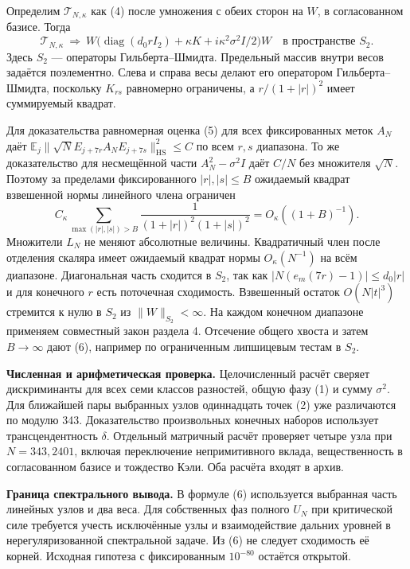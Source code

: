 \documentclass[11pt,a4paper]{article}
\newcommand{\subt}[1]{\par\medskip\noindent\textbf{#1.}\quad}
\newcommand{\HS}{\mathrm{HS}}
\begin{document}
Определим \(\mathcal T_{N,\kappa}\) как (4) после умножения с обеих сторон на \(W\), в согласованном базисе. Тогда
\begin{equation}
  \mathcal T_{N,\kappa}\ \Longrightarrow\
    W\bigl(\operatorname{diag}(d_0 r I_2)+\kappa K
                               +i\kappa^2\sigma^2 I/2\bigr)W
            \quad\text{в пространстве } S_2 .
                                                               \tag{6}
\end{equation}
Здесь \(S_2\) --- операторы Гильберта--Шмидта. Предельный массив внутри весов задаётся поэлементно. Слева и справа весы делают его оператором Гильберта--Шмидта, поскольку \(K_{rs}\) равномерно ограничены, а \(r/(1+|r|)^2\) имеет суммируемый квадрат.

Для доказательства равномерная оценка (5) для всех фиксированных меток \(A_N\) даёт
\(\mathbb E_j\|\sqrt N E_{j+7r}A_NE_{j+7s}\|_{\HS}^2\le C\)
по всем \(r,s\) диапазона. То же доказательство для несмещённой части \(A_N^2-\sigma^2 I\) даёт \(C/N\) без множителя \(\sqrt N\). Поэтому за пределами фиксированного \(|r|,|s|\le B\) ожидаемый квадрат взвешенной нормы линейного члена ограничен
\[
 C_\kappa
       \sum_{\max(|r|,|s|)>B}\frac1{(1+|r|)^2(1+|s|)^2}
                                      =O_\kappa((1+B)^{-1}).
\]
Множители \(L_N\) не меняют абсолютные величины. Квадратичный член после отделения скаляра имеет ожидаемый квадрат нормы \(O_\kappa(N^{-1})\) на всём диапазоне. Диагональная часть сходится в \(S_2\), так как
\(\big|N(e_m(7r)-1)\big|\le d_0|r|\) и для конечного \(r\) есть поточечная сходимость. Взвешенный остаток \(O(N|t|^3)\) стремится к нулю в \(S_2\) из \(\|W\|_{S_2}<\infty\). На каждом конечном диапазоне применяем совместный закон раздела 4. Отсечение общего хвоста и затем \(B\to\infty\) дают (6), например по ограниченным липшицевым тестам в \(S_2\).

\subt{Численная и арифметическая проверка}
Целочисленный расчёт сверяет дискриминанты для всех семи классов разностей, общую фазу (1) и сумму \(\sigma^2\). Для ближайшей пары выбранных узлов одиннадцать точек (2) уже различаются по модулю 343. Доказательство произвольных конечных наборов использует трансцендентность \(\delta\). Отдельный матричный расчёт проверяет четыре узла при \(N=343,2401\), включая переключение непримитивного вклада, вещественность в согласованном базисе и тождество Кэли. Оба расчёта входят в архив.

\subt{Граница спектрального вывода}
В формуле (6) используется выбранная часть линейных узлов и два веса. Для собственных фаз полного \(U_N\) при критической силе требуется учесть исключённые узлы и взаимодействие дальних уровней в нерегуляризованной спектральной задаче. Из (6) не следует сходимость её корней. Исходная гипотеза с фиксированным \(10^{-80}\) остаётся открытой.
\end{document}
